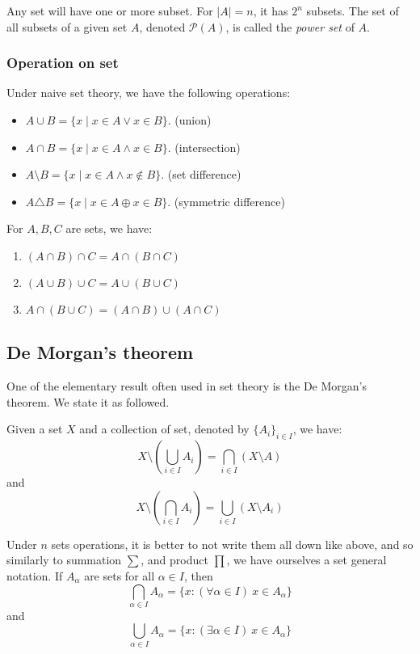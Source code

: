 Any set will have one or more subset. For $|A|=n$, it has $2^n$ subsets. The set of all subsets of a given set $A$, denoted $\mathcal{P}(A)$, is called the \textit{power set} of $A$. 

\subsubsection{Operation on set}
Under naive set theory, we have the following operations: 
\begin{itemize}[noitemsep,topsep=0pt]
    \item $A\cup B = \{x\mid x\in A \lor x\in B\}$. (union)
    \item  $A\cap B = \{x\mid x\in A \land x\in B\}$. (intersection)
    \item $A\setminus B = \{x\mid x\in A \land x \not\in B\}$. (set difference) 
    \item $A\triangle B = \{x\mid x\in A \oplus x\in B\}$. (symmetric difference)
\end{itemize}

\begin{theorem}[operations]
    For $A,B,C$ are sets, we have: 

    \begin{enumerate}
        \item $(A\cap B)\cap C=A\cap(B\cap C)$
        \item $(A\cup B)\cup C=A\cup(B\cup C)$
        \item $A\cap(B\cup C)=(A\cap B)\cup(A\cap C)$
    \end{enumerate}
\end{theorem}
\subsection{De Morgan's theorem}
One of the elementary result often used in set theory is the De Morgan's theorem. We state it as followed. 
\begin{theorem}[De Morgan]
    Given a set $X$ and a collection of set, denoted by $\{A_i\}_{i\in I}$, we have: 
    \begin{equation}
        X\setminus \left(\bigcup_{i \in I} A_{i}  \right)=\bigcap_{i \in I} (X \setminus A)
    \end{equation}
    and 
    \begin{equation}
        X\setminus\left(\bigcap_{i \in I} A_{i}\right)= \bigcup_{i \in I} (X \setminus A_{i})
    \end{equation}
\end{theorem}
Under $n$ sets operations, it is better to not write them all down like above, and so similarly to summation $\sum$, and product $\prod$, we have ourselves a set general notation. If $A_{\alpha}$ are sets for all $\alpha\in I$, then $$\bigcap_{\alpha\in I}A_{\alpha}=\{ x: (\forall \alpha\in I)\: x\in A_{\alpha} \}$$
and $$\bigcup_{\alpha\in I}A_{\alpha}=\{ x: (\exists \alpha\in I)\: x\in A_{\alpha} \}$$
